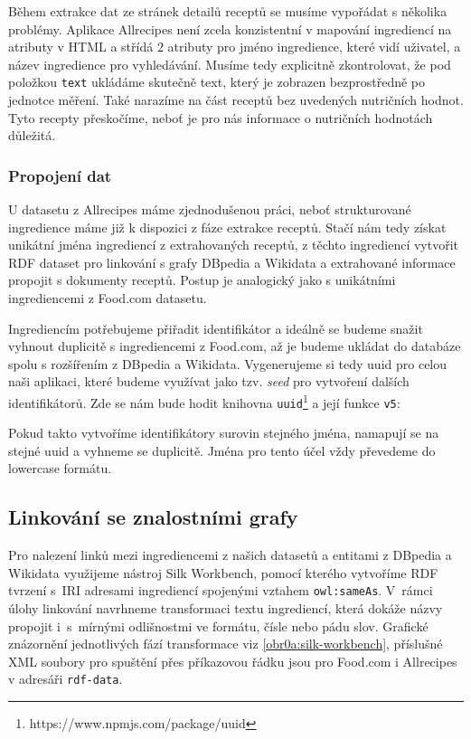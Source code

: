 Během extrakce dat ze stránek detailů receptů se musíme vypořádat s několika problémy. Aplikace Allrecipes není zcela konzistentní v mapování ingrediencí na atributy v HTML a střídá $2$ atributy pro jméno ingredience, které vidí uživatel, a název ingredience pro vyhledávání. Musíme tedy explicitně zkontrolovat, že pod položkou \texttt{text} ukládáme skutečně text, který je zobrazen bezprostředně po jednotce měření. Také narazíme na část receptů bez uvedených nutričních hodnot. Tyto recepty přeskočíme, neboť je pro nás informace o nutričních hodnotách důležitá.

\subsubsection{Propojení dat}

U datasetu z Allrecipes máme zjednodušenou práci, neboť strukturované ingredience máme již k dispozici z fáze extrakce receptů. Stačí nám tedy získat unikátní jména ingrediencí z extrahovaných receptů, z těchto ingrediencí vytvořit RDF dataset pro linkování s grafy DBpedia a Wikidata a extrahované informace propojit s dokumenty receptů. Postup je analogický jako s unikátními ingrediencemi z Food.com datasetu. 

Ingrediencím potřebujeme přiřadit identifikátor a ideálně se budeme snažit vyhnout duplicitě s ingrediencemi z Food.com, až je budeme ukládat do databáze spolu s rozšířením z DBpedia a Wikidata. Vygenerujeme si tedy uuid pro celou naši aplikaci, které budeme využívat jako tzv. \emph{seed} pro vytvoření dalších identifikátorů. Zde se nám bude hodit knihovna \texttt{uuid}\footnote{https://www.npmjs.com/package/uuid} a její funkce \texttt{v5}:
\begin{code}
uuid.v5(name, NAMESPACE_UUID)}
\end{code}
Pokud takto vytvoříme identifikátory surovin stejného jména, namapují se na stejné uuid a vyhneme se duplicitě. Jména pro tento účel vždy převedeme do lowercase formátu.

\subsection{Linkování se znalostními grafy}

Pro nalezení linků mezi ingrediencemi z našich datasetů a entitami z DBpedia a Wikidata využijeme nástroj Silk Workbench, pomocí kterého vytvoříme RDF tvrzení s~IRI adresami ingrediencí spojenými vztahem \texttt{owl:sameAs}. V~rámci úlohy linkování navrhneme transformaci textu ingrediencí, která dokáže názvy propojit i~s~mírnými odlišnostmi ve formátu, čísle nebo pádu slov. Grafické znázornění jednotlivých fází transformace viz \ref{obr0a:silk-workbench}, příslušné XML soubory pro spuštění přes příkazovou řádku jsou pro Food.com i Allrecipes v adresáři \texttt{rdf-data}.

